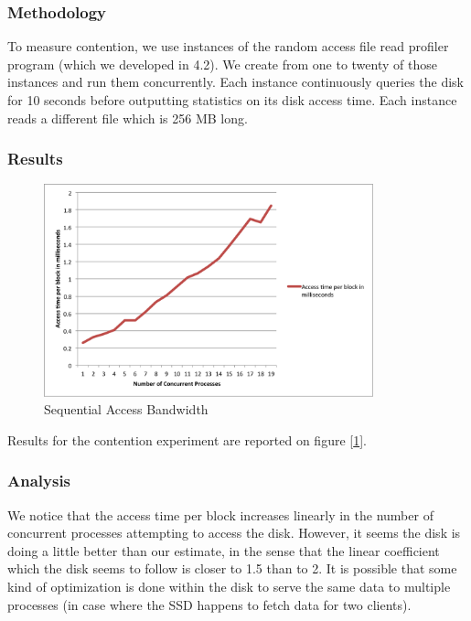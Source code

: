 \subsubsection{Methodology}

To measure contention, we use instances of the random access file read profiler program (which we developed in 4.2). We create from one to twenty of those instances and run them concurrently. Each instance continuously queries the disk for 10 seconds before outputting statistics on its disk access time. Each instance reads a different file which is 256 MB long. 

\subsubsection{Results}

\begin{figure}
 \centering
  \includegraphics[width=0.85\textwidth]{image/contention.png}
  \caption{Sequential Access Bandwidth}
 \label{fig:contention}
\end{figure}

Results for the contention experiment are reported on figure [\ref{fig:contention}].

\subsubsection{Analysis}

We notice that the access time per block increases linearly in the number of concurrent processes attempting to access the disk. However, it seems the disk is doing a little better than our estimate, in the sense that the linear coefficient which the disk seems to follow is closer to 1.5 than to 2. It is possible that some kind of optimization is done within the disk to serve the same data to multiple processes (in case where the SSD happens to fetch data for two clients). 

